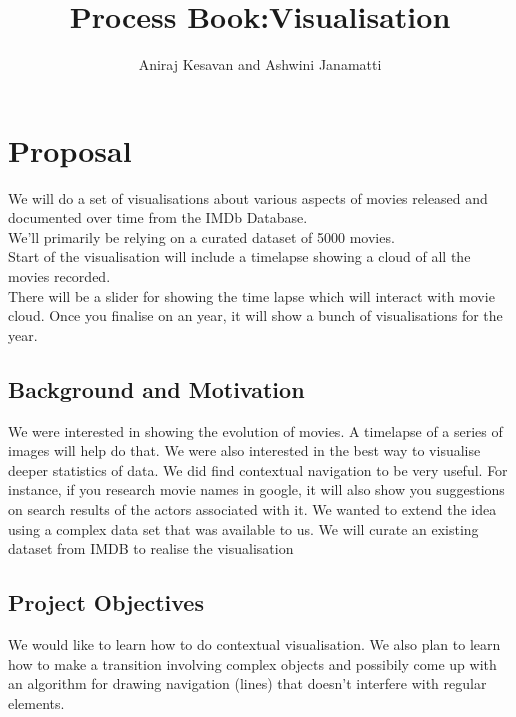 \documentclass{report}
\title{Process Book:Visualisation}
\author{Aniraj Kesavan and Ashwini Janamatti}
\begin{document}
\maketitle
\chapter{Proposal}
We will do a set of visualisations about various aspects of movies released and documented over time from the IMDb Database.\\
We'll primarily be relying on a curated dataset of 5000 movies.\\
Start of the visualisation will include a timelapse showing a cloud of all the movies recorded.\\
There will be a slider for showing the time lapse which will interact with movie cloud. Once you finalise on an year, it will show a bunch of visualisations for the year.\\

\section{Background and Motivation}
We were interested in showing the evolution of movies. A timelapse of a series 
of images will help do that. We were also interested in the best way to visualise 
deeper statistics of data. We did find contextual navigation to be very useful.
For instance, if you research movie names in google, it will also show you suggestions on search results of the actors associated with it. We wanted to extend
the idea using a complex data set that was available to us. We will curate an existing dataset from IMDB to realise the visualisation

\section{Project Objectives}
We would like to learn how to do contextual visualisation. We also plan to learn how to make a transition involving complex objects and possibily come up with an algorithm for drawing navigation (lines) that doesn't interfere with regular elements.
\end{document}
